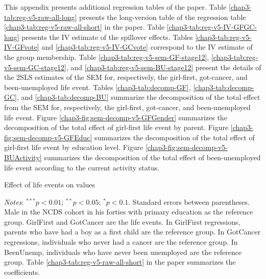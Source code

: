 This appendix presents additional regression tables of the paper. 
Table \ref{chap3-tab:reg-v5-raw-all-long} presents the long-version table of the regression table \ref{chap3-tab:reg-v5-raw-all-short} in the paper.
Table \ref{chap3-tab:reg-v5-IV-GFGC-long} presents the IV estimate of the spillover effects. Tables \ref{chap3-tab:reg-v5-IV-GFvote} and \ref{chap3-tab:reg-v5-IV-GCvote} correspond to the IV estimate of the group membership.
Table \ref{chap3-tab:reg-v5-sem-GF-stage12}, \ref{chap3-tab:reg-v5-sem-GC-stage12}, and \ref{chap3-tab:reg-v5-sem-BU-stage12} present the details of the 2SLS estimates of the SEM for, respectively, the girl-first, got-cancer, and been-unemployed life event.
Tables \ref{chap3-tab:decomp-GF}, \ref{chap3-tab:decomp-GC}, and \ref{chap3-tab:decomp-BU} summarize the decomposition of the total effect from the SEM for, respectively, the girl-first, got-cancer, and been-unemployed life event.
Figure \ref{chap3-fig:sem-decomp-v5-GFGender} summarizes the decomposition of the total
effect of girl-first life event by parent. 
Figure \ref{chap3-fig:sem-decomp-v5-GFEduc} summarizes the decomposition of the total
effect of girl-first life event by education level.
Figure \ref{chap3-fig:sem-decomp-v5-BUActivity} summarizes the decomposition of the total
effect of been-unemployed life event according to the current activity status.


\begin{table}[!htb]
    \centering
    \caption{Effect of life events on values}
    \label{chap3-tab:reg-v5-raw-all-long}
    \begin{threeparttable}
        \setlength{\tabcolsep}{0pt}
        
        \begin{tablenotes}[flushleft]
            \footnotesize{\item \textit{Notes}: $^{***}p<0.01$; $^{**}p<0.05$; $^{*}p<0.1$. Standard errors between parentheses. Male in the NCDS cohort in his forties with primary education as the reference group. GirlFirst and GotCancer are the life events. In GirlFirst regressions, parents who have had a boy as a first child are the reference group. In GotCancer regressions, individuals who never had a cancer are the reference group. In BeenUnemp, individuals who have never been unemployed are the reference group. Table \ref{chap3-tab:reg-v5-raw-all-short} in the paper summarizes the coefficients.}
        \end{tablenotes}
    \end{threeparttable}
\end{table}

